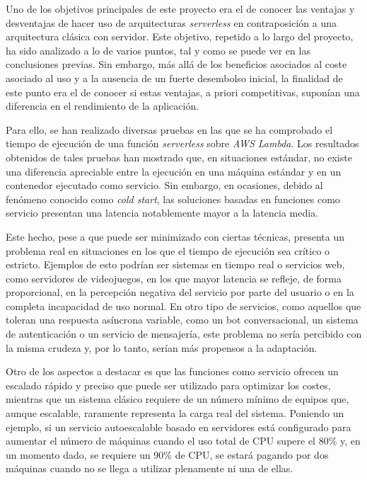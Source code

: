 \documentclass[11pt,spanish,listoffigures]{tfgetsinf}
\begin{document}
Uno de los objetivos principales de este proyecto era el de conocer las ventajas y desventajas de hacer uso de arquitecturas \textit{serverless} en contraposición a una arquitectura clásica con servidor. Este objetivo, repetido a lo largo del proyecto, ha sido analizado a lo de varios puntos, tal y como se puede ver en las conclusiones previas. Sin embargo, más allá de los beneficios asociados al coste asociado al uso y a la ausencia de un fuerte desembolso inicial, la finalidad de este punto era el de conocer si estas ventajas, a priori competitivas, suponían una diferencia en el rendimiento de la aplicación.

Para ello, se han realizado diversas pruebas en las que se ha comprobado el tiempo de ejecución de una función \textit{serverless} sobre \textit{AWS Lambda}. Los resultados obtenidos de tales pruebas han mostrado que, en situaciones estándar, no existe una diferencia apreciable entre la ejecución en una máquina estándar y en un contenedor ejecutado como servicio. Sin embargo, en ocasiones, debido al fenómeno conocido como \textit{cold start}, las soluciones basadas en funciones como servicio presentan una latencia notablemente mayor a la latencia media. 

Este hecho, pese a que puede ser minimizado con ciertas técnicas, presenta un problema real en situaciones en los que el tiempo de ejecución sea crítico o estricto. Ejemplos de esto podrían ser sistemas en tiempo real o servicios web, como servidores de videojuegos, en los que mayor latencia se refleje, de forma proporcional, en la percepción negativa del servicio por parte del usuario o en la completa incapacidad de uso normal. En otro tipo de servicios, como aquellos que toleran una respuesta asíncrona variable, como un bot conversacional, un sistema de autenticación o un servicio de mensajería, este problema no sería percibido con la misma crudeza y, por lo tanto, serían más propensos a la adaptación.

Otro de los aspectos a destacar es que las funciones como servicio ofrecen un escalado rápido y preciso que puede ser utilizado para optimizar los costes, mientras que un sistema clásico requiere de un número mínimo de equipos que, aunque escalable, raramente representa la carga real del sistema. Poniendo un ejemplo, si un servicio autoescalable basado en servidores está configurado para aumentar el número de máquinas cuando el uso total de CPU supere el 80\% y, en un momento dado, se requiere un 90\% de CPU, se estará pagando por dos máquinas cuando no se llega a utilizar plenamente ni una de ellas. 
\end{document}
